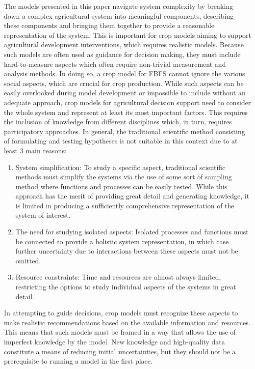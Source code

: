 \documentclass[]{elsarticle} %
\begin{document}
The models presented in this paper navigate system complexity by breaking down a complex agricultural system into meaningful components, describing these components and bringing them together to provide a reasonable representation of the system. This is important for crop models aiming to support agricultural development interventions, which requires realistic models. Because such models are often used as guidance for decision making, they must include hard-to-measure aspects which often require non-trivial measurement and analysis methods. In doing so, a crop model for FBFS cannot ignore the various social aspects, which are crucial for crop production. While such aspects can be easily overlooked during model development or impossible to include without an adequate approach, crop models for agricultural decision support need to consider the whole system and represent at least its most important factors. This requires the inclusion of knowledge from different disciplines which, in turn, requires participatory approaches. In general, the traditional scientific method consisting of formulating and testing hypotheses is not suitable in this context due to at least 3 main reasons:

\begin{enumerate}
\def\labelenumi{\arabic{enumi}.}
\item
  System simplification: To study a specific aspect, traditional scientific methods must simplify the systems via the use of some sort of sampling method where functions and processes can be easily tested. While this approach has the merit of providing great detail and generating knowledge, it is limited in producing a sufficiently comprehensive representation of the system of interest.
\item
  The need for studying isolated aspects: Isolated processes and functions must be connected to provide a holistic system representation, in which case further uncertainty due to interactions between these aspects must not be omitted.
\item
  Resource constraints: Time and resources are almost always limited, restricting the options to study individual aspects of the systems in great detail.
\end{enumerate}

In attempting to guide decisions, crop models must recognize these aspects to make realistic recommendations based on the available information and resources. This means that such models must be framed in a way that allows the use of imperfect knowledge by the model. New knowledge and high-quality data constitute a means of reducing initial uncertainties, but they should not be a prerequisite to running a model in the first place.
\end{document}
